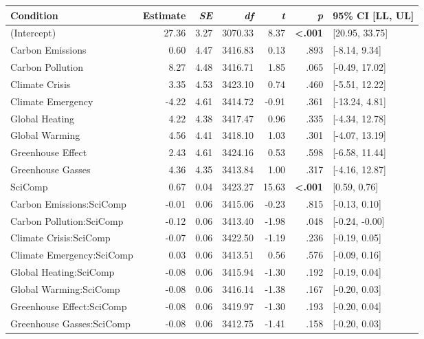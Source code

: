 \begin{table}[ht]
\centering
\begin{tabular}{lrrrrrl}
  \hline
Condition & Estimate & \textit{SE} & \textit{df} & \textit{t} & \textit{p} & 95\% CI [LL, UL] \\ 
  \hline
(Intercept) & 27.36 & 3.27 & 3070.33 & 8.37 & \textbf{\textless  .001} & [20.95, 33.75] \\ 
  Carbon Emissions & 0.60 & 4.47 & 3416.83 & 0.13 & .893 & [-8.14, 9.34] \\ 
  Carbon Pollution & 8.27 & 4.48 & 3416.71 & 1.85 & .065 & [-0.49, 17.02] \\ 
  Climate Crisis & 3.35 & 4.53 & 3423.10 & 0.74 & .460 & [-5.51, 12.22] \\ 
  Climate Emergency & -4.22 & 4.61 & 3414.72 & -0.91 & .361 & [-13.24, 4.81] \\ 
  Global Heating & 4.22 & 4.38 & 3417.47 & 0.96 & .335 & [-4.34, 12.78] \\ 
  Global Warming & 4.56 & 4.41 & 3418.10 & 1.03 & .301 & [-4.07, 13.19] \\ 
  Greenhouse Effect & 2.43 & 4.61 & 3424.16 & 0.53 & .598 & [-6.58, 11.44] \\ 
  Greenhouse Gasses & 4.36 & 4.35 & 3413.84 & 1.00 & .317 & [-4.16, 12.87] \\ 
  SciComp & 0.67 & 0.04 & 3423.27 & 15.63 & \textbf{\textless  .001} & [0.59, 0.76] \\ 
  Carbon Emissions:SciComp & -0.01 & 0.06 & 3415.06 & -0.23 & .815 & [-0.13, 0.10] \\ 
  Carbon Pollution:SciComp & -0.12 & 0.06 & 3413.40 & -1.98 & .048 & [-0.24, -0.00] \\ 
  Climate Crisis:SciComp & -0.07 & 0.06 & 3422.50 & -1.19 & .236 & [-0.19, 0.05] \\ 
  Climate Emergency:SciComp & 0.03 & 0.06 & 3413.51 & 0.56 & .576 & [-0.09, 0.16] \\ 
  Global Heating:SciComp & -0.08 & 0.06 & 3415.94 & -1.30 & .192 & [-0.19, 0.04] \\ 
  Global Warming:SciComp & -0.08 & 0.06 & 3416.14 & -1.38 & .167 & [-0.20, 0.03] \\ 
  Greenhouse Effect:SciComp & -0.08 & 0.06 & 3419.97 & -1.30 & .193 & [-0.20, 0.04] \\ 
  Greenhouse Gasses:SciComp & -0.08 & 0.06 & 3412.75 & -1.41 & .158 & [-0.20, 0.03] \\ 
   \hline
\end{tabular}
\end{table}
